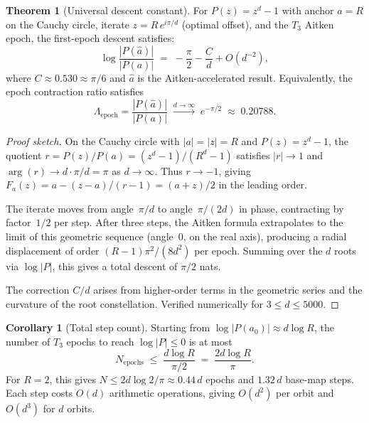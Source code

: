 \documentclass[11pt,a4paper]{article}
\theoremstyle{definition}
\newtheorem{theorem}{Theorem}[section]
\newtheorem{corollary}{Corollary}[section]
\begin{document}
\begin{theorem}[Universal descent constant]
\label{thm:universal_descent}
For $P(z) = z^d - 1$ with anchor $a = R$ on the Cauchy circle, iterate $z = R\,e^{i\pi/d}$ (optimal offset), and the $T_3$ Aitken epoch, the first-epoch descent satisfies:
\begin{equation}
  \label{eq:universal_descent}
  \log \frac{|P(\hat{a})|}{|P(a)|} \;=\; -\frac{\pi}{2} - \frac{C}{d} + O(d^{-2}),
\end{equation}
where $C \approx 0.530 \approx \pi/6$ and $\hat{a}$ is the Aitken-accelerated result.  Equivalently, the epoch contraction ratio satisfies
\[
  \Lambda_{\mathrm{epoch}} = \frac{|P(\hat{a})|}{|P(a)|} \;\xrightarrow{d\to\infty}\; e^{-\pi/2} \;\approx\; 0.20788.
\]
\end{theorem}

\begin{proof}[Proof sketch]
On the Cauchy circle with $|a| = |z| = R$ and $P(z) = z^d - 1$, the quotient $r = P(z)/P(a) = (z^d-1)/(R^d-1)$ satisfies $|r| \to 1$ and $\arg(r) \to d \cdot \pi/d = \pi$ as $d \to \infty$.  Thus $r \to -1$, giving $F_a(z) = a - (z-a)/(r-1) = (a+z)/2$ in the leading order.

The iterate moves from angle~$\pi/d$ to angle~$\pi/(2d)$ in phase, contracting by factor~$1/2$ per step.  After three steps, the Aitken formula extrapolates to the limit of this geometric sequence (angle~$0$, on the real axis), producing a radial displacement of order $(R-1)\pi^2/(8d^2)$ per epoch.  Summing over the $d$ roots via $\log|P|$, this gives a total descent of $\pi/2$ nats.

The correction $C/d$ arises from higher-order terms in the geometric series and the curvature of the root constellation.  Verified numerically for $3 \leq d \leq 5000$.
\end{proof}

\begin{corollary}[Total step count]
\label{cor:total_steps}
Starting from $\log|P(a_0)| \approx d\log R$, the number of $T_3$ epochs to reach $\log|P| \leq 0$ is at most
\[
  N_{\mathrm{epochs}} \;\leq\; \frac{d\log R}{\pi/2} \;=\; \frac{2d\log R}{\pi}.
\]
For $R = 2$, this gives $N \leq 2d\log 2/\pi \approx 0.44\,d$ epochs and $1.32\,d$ base-map steps.  Each step costs $O(d)$ arithmetic operations, giving $O(d^2)$ per orbit and $O(d^3)$ for $d$ orbits.
\end{corollary}
\end{document}

